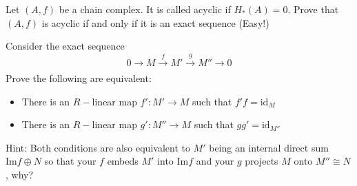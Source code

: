 \documentclass[12pt,reqno]{amsart}
\numberwithin{theorem}{section}
\theoremstyle{definition}
\theoremstyle{remark}
\numberwithin{equation}{section}
\renewcommand{\Im}{\text{Im}}
\theoremstyle{definition}
\newcommand{\id}{\mathrm{id}}
\begin{document}
\begin{exercise}
    Let $(A,f)$ be a chain complex. It is called acyclic if $H_*(A) = 0$. Prove that $(A,f)$ is acyclic if and only if it is an exact sequence (Easy!)
\end{exercise}
\begin{exercise}
Consider the exact sequence
$$0 \rightarrow M \xrightarrow[]{f}M'\xrightarrow[]{g}M''\rightarrow 0 $$
    Prove the following are equivalent:
    \begin{itemize}
        \item There is an $R-$linear map $f': M' \rightarrow M$ such that $f'f = \id_M$
        \item There is an $R-$linear map $g': M'' \rightarrow M$ such that $gg'=\id_{M''}$
    \end{itemize}
Hint: Both conditions are also equivalent to $M'$ being an internal direct sum $\Im f \oplus N$ so that your $f$ embeds $M'$ into $\Im f$ and your $g$ projects $M$ onto $M'' \cong N$, why?
\end{exercise}
\end{document}
